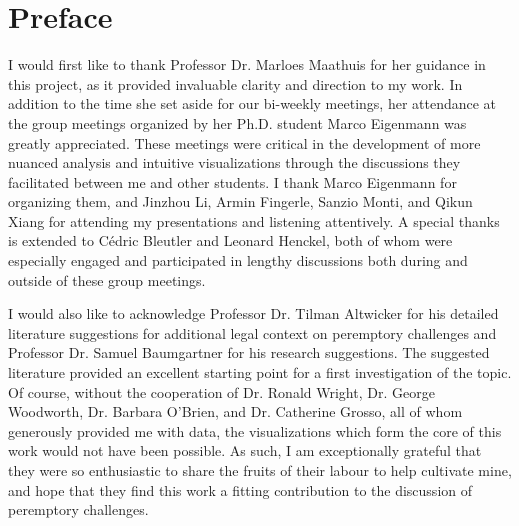 \chapter*{Preface}

I would first like to thank Professor Dr. Marloes Maathuis for her
guidance in this project, as it provided invaluable clarity and direction
to my work. In addition to the time she set aside for our bi-weekly
meetings, her attendance at the group meetings organized
by her Ph.D. student Marco Eigenmann was greatly appreciated. These
meetings were critical in the development of more nuanced analysis and intuitive visualizations
through the discussions they facilitated between me and other students. I thank Marco Eigenmann for organizing them, and Jinzhou
Li, Armin Fingerle, Sanzio Monti, and Qikun Xiang for attending my presentations and listening attentively. A special thanks is
extended to C\'edric Bleutler and Leonard Henckel, both of whom were especially engaged and participated in lengthy discussions
both during and outside of these group meetings.

I would also like to acknowledge Professor Dr. Tilman Altwicker for his detailed literature suggestions for additional legal context
on peremptory challenges and Professor Dr. Samuel Baumgartner for his
research suggestions. The suggested literature provided an excellent
starting point for a first investigation of the topic. Of course, without the cooperation of Dr. Ronald Wright, Dr. George
Woodworth, Dr. Barbara O'Brien, and Dr. Catherine Grosso, all of whom generously provided me with data, the visualizations which
form the core of this work would not have been possible. As such, I am exceptionally grateful that they were so enthusiastic to
share the fruits of their labour to help cultivate mine, and hope that they find this work a fitting contribution to the
discussion of peremptory challenges.


